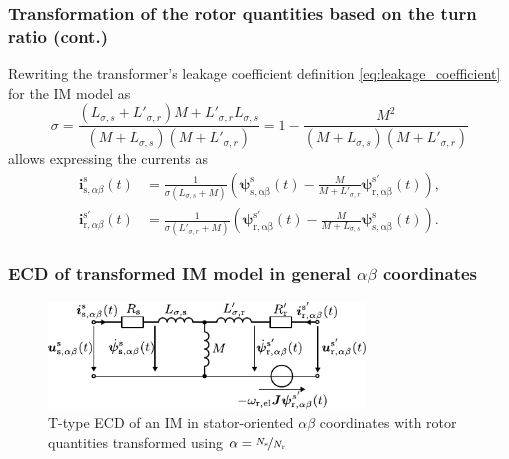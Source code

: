 \begin{frame}
	\frametitle{Transformation of the rotor quantities based on the turn ratio (cont.)}
    Rewriting the transformer's leakage coefficient definition \eqref{eq:leakage_coefficient} for the IM model as
    \begin{equation}
        \sigma = \frac{(L_{\sigma,s}+L'_{\sigma,r})M + L'_{\sigma,r}L_{\sigma,s}}{(M+L_{\sigma,s})(M + L'_{\sigma,r})} = 1 - \frac{M^2}{(M+L_{\sigma,s})(M + L'_{\sigma,r})}
    \end{equation}
    \pause
    allows expressing the currents as
    \begin{align}
        \bm{i}^\mathrm{s}_{\mathrm{s},\alpha\beta}(t) &= \frac{1}{\sigma(L_{\sigma,s} + M)}\left(\bm{\psi}^\mathrm{s}_\mathrm{s,\alpha\beta}(t)- \frac{M}{M+L'_{\sigma,r}}\bm{\psi}^\mathrm{s'}_\mathrm{r,\alpha\beta}(t)\right),\\
        \bm{i}^{\mathrm{s}'}_{\mathrm{r},\alpha\beta}(t) &= \frac{1}{\sigma(L'_{\sigma,r} + M)}\left(\bm{\psi}^{\mathrm{s}'}_\mathrm{r,\alpha\beta}(t)- \frac{M}{M+L_{\sigma,s}}\bm{\psi}^\mathrm{s}_\mathrm{s,\alpha\beta}(t)\right).
    \end{align}
\end{frame}

\begin{frame}
	\frametitle{ECD of transformed IM model in general $\alpha\beta$ coordinates}
    \begin{figure}
        \centering
		\includegraphics[width=0.75\textwidth]{fig/lec06/IM_T_ECD_alpha_beta.pdf}
        \caption{T-type ECD of an IM in stator-oriented $\alpha\beta$ coordinates with rotor quantities transformed using $\alpha = \nicefrac{N_\mathrm{s}}{N_\mathrm{r}}$}
		\label{fig:IM_T_ECD_alpha_beta}
    \end{figure}
\end{frame}


